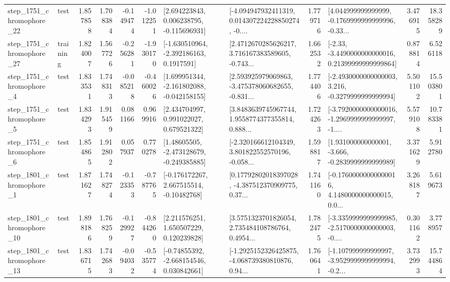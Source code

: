 \begin{tabular}{llrrrrllrlrr}
 step\_1751\_chromophore\_22 &      test &      1.857858 &    1.708384 &     -0.149474 & -1.012251 &    [2.694223843, 0.006238795, -0.115696931] &  [-4.094947932411319, 0.014307224228850274, -0.... &       1.779716 &  [4.044999999999999, -0.1769999999999996, -0.33... &            3.476915 &         18.358289 \\
 step\_1751\_chromophore\_27 &  training &      1.824007 &    1.567726 &     -0.256281 & -1.930170 &     [-1.630510964, -2.392186163, 0.1917591] &  [2.4712670285626217, 3.716167383589605, -0.743... &       1.662532 &  [-2.33, -3.4490000000000016, 0.21399999999999864] &            0.878814 &          6.526118 \\
  step\_1751\_chromophore\_4 &      test &      1.833531 &    1.748313 &     -0.085218 & -0.460026 &   [1.699951344, -2.161802088, -0.042158155] &  [2.593925979069863, -3.475378060682655, -0.831... &       1.774406 &  [-2.4930000000000003, 3.216, -0.3279999999999994] &            5.501102 &         15.503801 \\
  step\_1751\_chromophore\_5 &      test &      1.834293 &    1.915459 &      0.081166 &  0.969916 &     [2.434704997, 0.991022027, 0.679521322] &  [3.8483639745967744, 1.9558774377355814, 0.888... &       1.724263 &  [-3.7920000000000016, -1.2969999999999997, -1.... &            5.579108 &         10.783381 \\
  step\_1751\_chromophore\_6 &      test &      1.854865 &    1.912802 &      0.057937 &  0.770278 &    [1.48605505, -2.473128679, -0.249385885] &  [-2.320166612104349, 3.801822552570196, -0.058... &       1.598817 &   [1.931000000000001, -3.666, -0.2839999999999989] &            3.371629 &          5.912780 \\
  step\_1801\_chromophore\_1 &      test &      1.871627 &    1.748274 &     -0.123353 & -0.787765 &    [-0.176172267, 2.667515514, -0.10482768] &  [0.17792802018397028, -4.387512370909775, 0.37... &       1.741160 &  [-0.17600000000000016, 4.1480000000000015, 0.0... &            3.268187 &          5.619673 \\
 step\_1801\_chromophore\_10 &      test &      1.898186 &    1.768259 &     -0.129927 & -0.844260 &     [2.211576251, 1.650507229, 0.120239828] &  [3.5751323701826054, 2.735484108786764, 0.4954... &       1.782475 &  [-3.3359999999999985, -2.5170000000000003, -0.... &            0.301162 &          3.778957 \\
 step\_1801\_chromophore\_13 &      test &      1.836715 &    1.742683 &     -0.094032 & -0.535774 &    [-0.74855392, -2.668154546, 0.030842661] &  [-1.2925152326425875, -4.068739380810876, 0.94... &       1.760641 &  [-1.107999999999997, -3.9529999999999994, -0.2... &            3.732993 &         15.744864 \\

\end{tabular}
